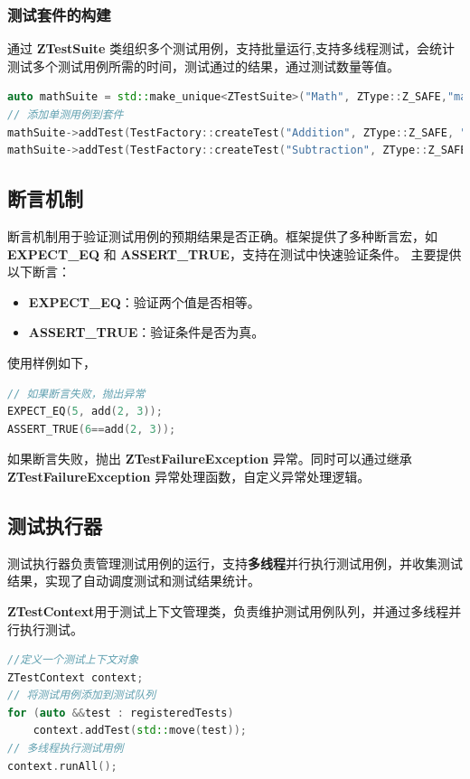 \documentclass[chinese]{article}
\begin{document}
\subsubsection{测试套件的构建}
通过 \textbf{ZTestSuite} 类组织多个测试用例，支持批量运行,支持多线程测试，会统计测试多个测试用例所需的时间，测试通过的结果，通过测试数量等值。

\begin{lstlisting}[language=C++]
auto mathSuite = std::make_unique<ZTestSuite>("Math", ZType::Z_SAFE,"math test");
// 添加单测用例到套件
mathSuite->addTest(TestFactory::createTest("Addition", ZType::Z_SAFE, "", add, 2, 3).setExpectedOutput(5).build());
mathSuite->addTest(TestFactory::createTest("Subtraction", ZType::Z_SAFE, "", subtract, 5, 3).setExpectedOutput(2).build());
\end{lstlisting}



\subsection{断言机制}
断言机制用于验证测试用例的预期结果是否正确。框架提供了多种断言宏，如 \textbf{EXPECT\_EQ} 和 \textbf{ASSERT\_TRUE}，支持在测试中快速验证条件。
主要提供以下断言：
\begin{itemize}
    \item \textbf{EXPECT\_EQ}：验证两个值是否相等。
    \item \textbf{ASSERT\_TRUE}：验证条件是否为真。
\end{itemize}
使用样例如下，
\begin{lstlisting}[language=C++]
// 如果断言失败，抛出异常
EXPECT_EQ(5, add(2, 3));
ASSERT_TRUE(6==add(2, 3));
\end{lstlisting}

如果断言失败，抛出 \textbf{ZTestFailureException} 异常。同时可以通过继承 \textbf{ZTestFailureException} 异常处理函数，自定义异常处理逻辑。


\subsection{测试执行器}
测试执行器负责管理测试用例的运行，支持\textbf{多线程}并行执行测试用例，并收集测试结果，实现了自动调度测试和测试结果统计。

\textbf{ZTestContext}用于测试上下文管理类，负责维护测试用例队列，并通过多线程并行执行测试。
\begin{lstlisting}[language=C++]
//定义一个测试上下文对象
ZTestContext context;
// 将测试用例添加到测试队列
for (auto &&test : registeredTests) 
    context.addTest(std::move(test));
// 多线程执行测试用例
context.runAll();
\end{lstlisting}
\end{document}
